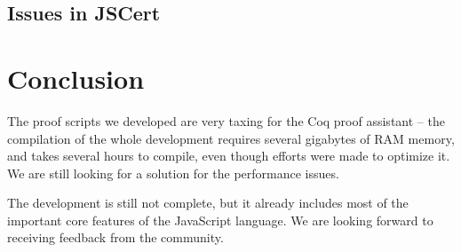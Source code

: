 \documentclass{llncs}
\newcommand{\mmi}[1]{\todo[color=aliceblue,inline]{#1}}
\begin{document}
\subsection{Issues in JSCert}

\mmi{TODO}

\section{Conclusion}

The proof scripts we developed are very taxing for the Coq
proof assistant -- the compilation of the whole development
requires several gigabytes of RAM memory, and takes several
hours to compile, even though efforts were made to optimize it.
We are still looking for a solution for the performance issues.

The development is still not complete, but it already
includes most of the important core features of the
JavaScript language. We are looking forward to receiving
feedback from the community.

\printbibliography
\end{document}
